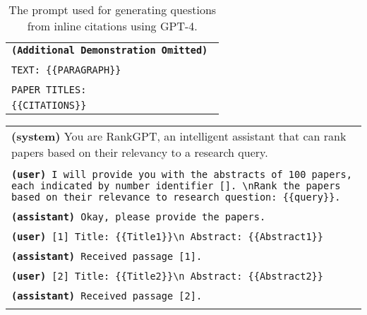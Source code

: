 \begin{table*}[ht]
\begin{tabular}{>{\raggedright\arraybackslash\tt}p{}<{}}
            \textbf{(Additional Demonstration Omitted)} \\\\
            TEXT: \{\{PARAGRAPH\}\} \\ \\

            PAPER TITLES: \\
            \{\{CITATIONS\}\} \\
            
        \bottomrule
    \end{tabular}
    \caption{
        The prompt used for generating questions from inline citations using GPT-4.
    }
    \label{tab:prompt_gen_question}
\end{table*}

\begin{table*}[h]
    \centering
    \small
    \begin{tabular}{>{\raggedright\arraybackslash\tt}p{}<{}}
        \toprule
            \vspace{-1em}

            \textbf{(system)} You are RankGPT, an intelligent assistant that can rank papers based on their relevancy to a research query. \\ \\
            
            \textbf{(user)} I will provide you with the abstracts of 100 papers, each indicated by number identifier []. \textbackslash nRank the papers based on their relevance to research question: \{\{query\}\}. \\ \\

            \textbf{(assistant)} Okay, please provide the papers. \\ \\

            \textbf{(user)} [1] Title: \{\{Title1\}\}\textbackslash n Abstract: \{\{Abstract1\}\} \\ \\

            \textbf{(assistant)} Received passage [1]. \\ \\

            \textbf{(user)} [2] Title: \{\{Title2\}\}\textbackslash n Abstract: \{\{Abstract2\}\} \\ \\

            \textbf{(assistant)} Received passage [2]. \\ \\


\end{tabular}
\end{table*}
